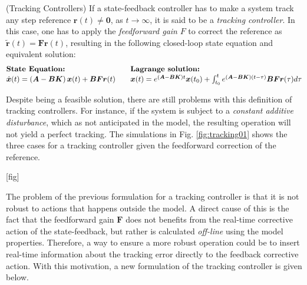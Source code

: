\documentclass[a4paper,11pt]{book}
\numberwithin{figure}{chapter}
\numberwithin{equation}{chapter}
\numberwithin{table}{chapter}
\theoremstyle{definition}
\newtheorem{definition}{Definition}[chapter]
\newcounter{boxed-theorem}
\newcounter{boxed-definition}
\newenvironment{boxed-definition}[1]
{\begin{shaded} \begin{definition}{#1}}
{\end{definition} \end{shaded}}
\begin{document}
\begin{boxed-definition}{(Tracking Controllers)} \label{def:tracking}
	If a state-feedback controller has to make a system track any step reference $\bm{r}(t) \neq \bm{0}$, as $t \to \infty$, it is said to be a \textit{tracking controller}. In this case, one has to apply the \textit{feedforward gain} $F$ to correct the reference as $\tilde{\bm{r}}(t) = \bm{F}\bm{r}(t)$, resulting in the following closed-loop state equation and equivalent solution:
	\begin{align}
	\begin{matrix*}[l]
	\textbf{State Equation:} \hfill & & \textbf{Lagrange solution:} \hfill \\
	\dot{\bm{x}}(t) = \left( \bm{A} - \bm{B} \bm{K} \right) \bm{x}(t) + \bm{B} \bm{F} \bm{r}(t)  & &
	\bm{x}(t) = e^{(\bm{A} - \bm{B} \bm{K}) t} \bm{x}(t_0) + \int_{t_0}^{t} e^{(\bm{A} - \bm{B} \bm{K}) (t - \tau)} \bm{B} \bm{F} \bm{r}(\tau) d \tau \hfill
	\end{matrix*}
	\end{align}
\end{boxed-definition}

Despite being a feasible solution, there are still problems with this definition of tracking controllers. For instance, if the system is subject to a \textit{constant additive disturbance}, which as not anticipated in the model, the resulting operation will not yield a perfect tracking. The simulations in Fig. \ref{fig:tracking01} shows the three cases for a tracking controller given the feedforward correction of the reference.

[fig]

The problem of the previous formulation for a tracking controller is that it is not robust to actions that happens outside the model. A direct cause of this is the fact that the feedforward gain $\bm{F}$ does not benefits from the real-time corrective action of the state-feedback, but rather is calculated \textit{off-line} using the model properties. Therefore, a way to ensure a more robust operation could be to insert real-time information about the tracking error directly to the feedback corrective action. With this motivation, a new formulation of the tracking controller is given below.
\end{document}

